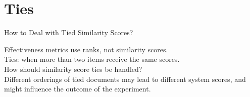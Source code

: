 \documentclass{beamer}
\begin{document}
\section{Ties}
\begin{frame}{How to Deal with Tied Similarity Scores?}

Effectiveness metrics use {\color{blue}ranks}, not {\color{blue}similarity scores}.\\[1.5em]

Ties: when more than two items receive the same scores.\\[1.5em]

How should \alert{similarity score ties} be handled?\\[1.5em]

{\color{blue}Different orderings} of tied documents may lead to {\color{blue}different system scores}, and might influence the outcome of the experiment.
\end{frame}
\end{document}
